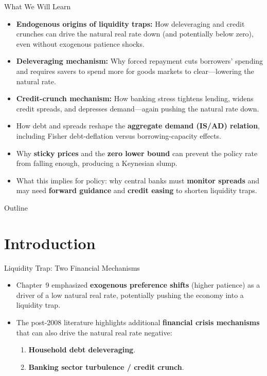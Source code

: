 \documentclass[11pt,aspectratio=169]{beamer}
\begin{document}
\begin{frame}{What We Will Learn}
\small
\begin{itemize}
  \item \textbf{Endogenous origins of liquidity traps:} How deleveraging and credit crunches can drive the natural real rate down (and potentially below zero), even without exogenous patience shocks.
  \item \textbf{Deleveraging mechanism:} Why forced repayment cuts borrowers’ spending and requires savers to spend more for goods markets to clear—lowering the natural rate.
  \item \textbf{Credit-crunch mechanism:} How banking stress tightens lending, widens credit spreads, and depresses demand—again pushing the natural rate down.
  \item How debt and spreads reshape the \textbf{aggregate demand (IS/AD) relation}, including Fisher debt-deflation versus borrowing-capacity effects.
  \item Why \textbf{sticky prices} and the \textbf{zero lower bound} can prevent the policy rate from falling enough, producing a Keynesian slump.
  \item What this implies for policy: why central banks must \textbf{monitor spreads} and may need \textbf{forward guidance} and \textbf{credit easing} to shorten liquidity traps.
\end{itemize}
\end{frame}

\begin{frame}{Outline}
\tableofcontents
\end{frame}

\section{Introduction}

\begin{frame}{Liquidity Trap: Two Financial Mechanisms}
\small
\begin{itemize}
  \item Chapter~9 emphasized \textbf{exogenous preference shifts} (higher patience) as a driver of a low natural real rate, potentially pushing the economy into a liquidity trap.
  \vspace{0.4em}
  \item The post-2008 literature highlights additional \textbf{financial crisis mechanisms} that can also drive the natural real rate negative:
  \begin{enumerate}
    \item \textbf{Household debt deleveraging}.
    \item \textbf{Banking sector turbulence / credit crunch}.
  \end{enumerate}
\end{itemize}
\end{frame}
\end{document}

